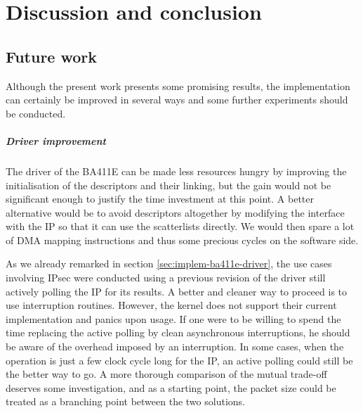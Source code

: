 \chapter{Discussion and conclusion}

\section{Future work}\label{sec:future-work}

Although the present work presents some promising results, the implementation can certainly be improved in several ways and some further experiments should be conducted.

\paragraph{Driver improvement}
The driver of the BA411E can be made less resources hungry by improving the initialisation of the descriptors and their linking, but the gain would not be significant enough to justify the time investment at this point.
A better alternative would be to avoid descriptors altogether by modifying the interface with the IP so that it can use the scatterlists directly.
We would then spare a lot of DMA mapping instructions and thus some precious cycles on the software side.

As we already remarked in section \ref{sec:implem-ba411e-driver}, the use cases involving IPsec were conducted using a previous revision of the driver still actively polling the IP for its results.
A better and cleaner way to proceed is to use interruption routines.
However, the kernel does not support their current implementation and panics upon usage.
If one were to be willing to spend the time replacing the active polling by clean asynchronous interruptions, he should be aware of the overhead imposed by an interruption.
In some cases, when the operation is just a few clock cycle long for the IP, an active polling could still be the better way to go.
A more thorough comparison of the mutual trade-off deserves some investigation, and as a starting point, the packet size could be treated as a branching point between the two solutions.


